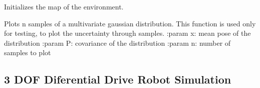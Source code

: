 \documentclass[letterpaper,10pt,english]{sphinxmanual}
\begin{document}
\begin{fulllineitems}
\begin{fulllineitems}
\end{fulllineitems}


\begin{fulllineitems}
\label{\detokenize{robot_simulation:SimulatedRobot.SimulatedRobot.SetMap}}
\pysigstartsignatures
{}
\pysigstopsignatures
\sphinxAtStartPar
Initializes the map of the environment.

\end{fulllineitems}


\begin{fulllineitems}
\label{\detokenize{robot_simulation:SimulatedRobot.SimulatedRobot._PlotSample}}
\pysigstartsignatures
{}
\pysigstopsignatures
\sphinxAtStartPar
Plots n samples of a multivariate gaussian distribution. This function is used only for testing, to plot the
uncertainty through samples.
:param x: mean pose of the distribution
:param P: covariance of the distribution
:param n: number of samples to plot

\end{fulllineitems}


\end{fulllineitems}



\subsection{3 DOF Diferential Drive Robot Simulation}
\label{\detokenize{robot_simulation:dof-diferential-drive-robot-simulation}}
\end{document}
